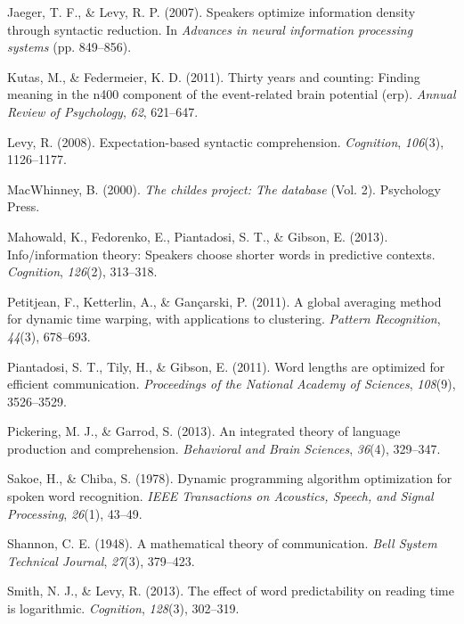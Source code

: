 \documentclass[10pt, letterpaper]{article}
\begin{document}
\leavevmode\hypertarget{ref-jaeger2007}{}%
Jaeger, T. F., \& Levy, R. P. (2007). Speakers optimize information
density through syntactic reduction. In \emph{Advances in neural
information processing systems} (pp. 849--856).

\leavevmode\hypertarget{ref-kutas2011}{}%
Kutas, M., \& Federmeier, K. D. (2011). Thirty years and counting:
Finding meaning in the n400 component of the event-related brain
potential (erp). \emph{Annual Review of Psychology}, \emph{62},
621--647.

\leavevmode\hypertarget{ref-levy2008}{}%
Levy, R. (2008). Expectation-based syntactic comprehension.
\emph{Cognition}, \emph{106}(3), 1126--1177.

\leavevmode\hypertarget{ref-macwhinney2000}{}%
MacWhinney, B. (2000). \emph{The childes project: The database} (Vol.
2). Psychology Press.

\leavevmode\hypertarget{ref-mahowald2013}{}%
Mahowald, K., Fedorenko, E., Piantadosi, S. T., \& Gibson, E. (2013).
Info/information theory: Speakers choose shorter words in predictive
contexts. \emph{Cognition}, \emph{126}(2), 313--318.

\leavevmode\hypertarget{ref-petitjean2011}{}%
Petitjean, F., Ketterlin, A., \& Gançarski, P. (2011). A global
averaging method for dynamic time warping, with applications to
clustering. \emph{Pattern Recognition}, \emph{44}(3), 678--693.

\leavevmode\hypertarget{ref-piantadosi2011}{}%
Piantadosi, S. T., Tily, H., \& Gibson, E. (2011). Word lengths are
optimized for efficient communication. \emph{Proceedings of the National
Academy of Sciences}, \emph{108}(9), 3526--3529.

\leavevmode\hypertarget{ref-pickering2013}{}%
Pickering, M. J., \& Garrod, S. (2013). An integrated theory of language
production and comprehension. \emph{Behavioral and Brain Sciences},
\emph{36}(4), 329--347.

\leavevmode\hypertarget{ref-sakoe1978}{}%
Sakoe, H., \& Chiba, S. (1978). Dynamic programming algorithm
optimization for spoken word recognition. \emph{IEEE Transactions on
Acoustics, Speech, and Signal Processing}, \emph{26}(1), 43--49.

\leavevmode\hypertarget{ref-shannon1948}{}%
Shannon, C. E. (1948). A mathematical theory of communication.
\emph{Bell System Technical Journal}, \emph{27}(3), 379--423.

\leavevmode\hypertarget{ref-smith2013}{}%
Smith, N. J., \& Levy, R. (2013). The effect of word predictability on
reading time is logarithmic. \emph{Cognition}, \emph{128}(3), 302--319.
\end{document}
